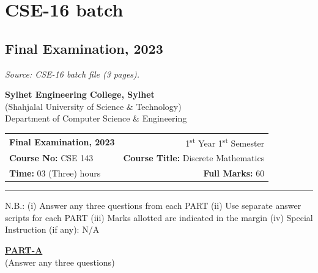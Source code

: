 \documentclass[11pt,a4paper]{article}
\makeatletter
\newcommand{\srcnote}[1]{{\footnotesize\itshape Source: #1}\par\smallskip}
\renewcommand{\partname}[2]{\begin{center}\textbf{\underline{#1}}\\[-1pt]{\small #2}\end{center}}
\newcommand{\paperhead}[5]{%
\begin{center}
{\large\bfseries Sylhet Engineering College, Sylhet}\\
{\small (Shahjalal University of Science \& Technology)}\\
{\small Department of Computer Science \& Engineering}
\end{center}
\vspace{-2pt}
\noindent\begin{tabular*}{\linewidth}{@{}l@{\extracolsep{\fill}}r@{}}
\textbf{#1} & 1\textsuperscript{st} Year 1\textsuperscript{st} Semester\\
\textbf{Course No:} #2 & \textbf{Course Title:} #5\\
\textbf{Time:} #3 & \textbf{Full Marks:} #4
\end{tabular*}\par\smallskip\hrule\medskip}
\makeatother
\begin{document}
\clearpage
\section{CSE-16 batch}
\subsection{Final Examination, 2023}
\srcnote{CSE-16 batch file (3 pages).}
\paperhead{Final Examination, 2023}{CSE 143}{03 (Three) hours}{60}{Discrete Mathematics}
{\small N.B.: (i) Answer any three questions from each PART \quad (ii) Use separate answer scripts for each PART \quad (iii) Marks allotted are indicated in the margin \quad (iv) Special Instruction (if any): N/A}

\partname{PART-A}{(Answer any three questions)}
\end{document}
